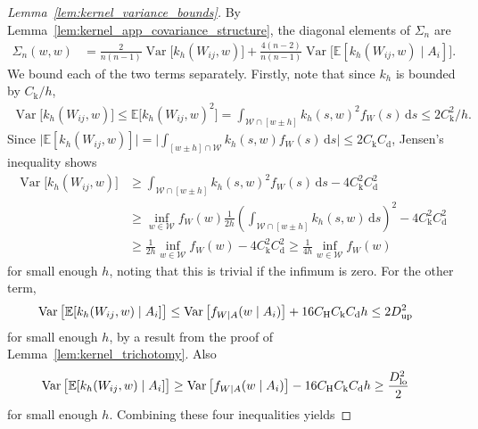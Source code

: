 \documentclass[11pt,lof]{puthesis}
\newcommand{\E}{\ensuremath{\mathbb{E}}}
\newcommand{\rH}{\ensuremath{\mathrm{H}}}
\newcommand{\rk}{\ensuremath{\mathrm{k}}}
\newcommand{\rd}{\ensuremath{\mathrm{d}}}
\newcommand{\cW}{\ensuremath{\mathcal{W}}}
\newcommand{\Dl}{\ensuremath{D_{\textup{lo}}}}
\newcommand{\Du}{\ensuremath{D_{\textup{up}}}}
\DeclareMathOperator{\Var}{Var}
\newcommand{\diff}[1]{\,\mathrm{d}#1}
\theoremstyle{break}
\theoremstyle{proof}
\newtheorem{proof}{Proof}
\begin{document}
\begin{proof}[Lemma~\ref{lem:kernel_variance_bounds}]

  By Lemma~\ref{lem:kernel_app_covariance_structure},
  the diagonal elements of $\Sigma_n$ are
  \begin{align*}
    \Sigma_n(w,w)
    &=
    \frac{2}{n(n-1)}
    \Var\big[
      k_h(W_{i j},w)
    \big]
    +
    \frac{4(n-2)}{n(n-1)}
    \Var\big[
      \E[k_h(W_{i j},w) \mid A_i]
    \big].
  \end{align*}
  We bound each of the two terms separately.
  Firstly, note that since $k_h$ is bounded by $C_\rk/h$,
  \begin{align*}
    \Var\big[
      k_h(W_{i j},w)
    \big]
    \leq
    \E\big[
      k_h(W_{i j},w)^2
    \big]
    =
    \int_{\cW \cap [w \pm h]}
    k_h(s,w)^2
    f_W(s)
    \diff{s}
    \leq 2 C_\rk^2 / h.
  \end{align*}
  Since $\big|\E[k_h(W_{i j},w)]\big|
  = \big|\int_{[w \pm h] \cap \cW} k_h(s,w) f_W(s) \diff{s}\big|
  \leq 2 C_\rk C_\rd$, Jensen's inequality shows
  \begin{align*}
    \Var\big[
      k_h(W_{i j},w)
    \big]
    &\geq
    \int_{\cW \cap [w \pm h]}
    k_h(s,w)^2
    f_W(s)
    \diff{s}
    - 4 C_\rk^2 C_\rd^2 \\
    &\geq
    \inf_{w \in \cW} f_W(w)
    \frac{1}{2h}
    \left(
      \int_{\cW \cap [w \pm h]}
      k_h(s,w)
      \diff{s}
    \right)^2
    - 4 C_\rk^2 C_\rd^2 \\
    &\geq
    \frac{1}{2h}
    \inf_{w \in \cW} f_W(w)
    - 4 C_\rk^2 C_\rd^2
    \geq
    \frac{1}{4h}
    \inf_{w \in \cW} f_W(w)
  \end{align*}
  for small enough $h$, noting that this is trivial if the infimum is zero.
  For the other term,
  \begin{align*}
    \Var\big[
      \E[k_h(W_{i j},w) \mid A_i]
    \big]
    &\leq
    \Var\big[
      f_{W \mid A}(w \mid A_i)
    \big]
    + 16 C_\rH C_\rk C_\rd h
    \leq
    2 \Du^2
  \end{align*}
  for small enough $h$, by a result from
  the proof of Lemma~\ref{lem:kernel_trichotomy}.
  Also
  \begin{align*}
    \Var\big[
      \E[k_h(W_{i j},w) \mid A_i]
    \big]
    &\geq
    \Var\big[
      f_{W \mid A}(w \mid A_i)
    \big]
    - 16 C_\rH C_\rk C_\rd h
    \geq
    \frac{\Dl^2}{2}
  \end{align*}
  for small enough $h$.
  Combining these four inequalities yields

\end{proof}
\end{document}
